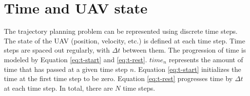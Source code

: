 \section{Time and UAV state}
\label{subsec:state}

The trajectory planning problem can be represented using discrete time steps. The state of the UAV (position, velocity, etc.) is defined at each time step. Time steps are spaced out regularly, with $\Delta t$ between them. The progression of time is modeled by Equation \ref{eq:t-start} and \ref{eq:t-rest}. $time_n$ represents the amount of time that has passed at a given time step $n$. Equation \ref{eq:t-start} initializes the time at the first time step to be zero. Equation \ref{eq:t-rest} progresses time by $\Delta t$ at each time step. In total, there are $N$ time steps.

